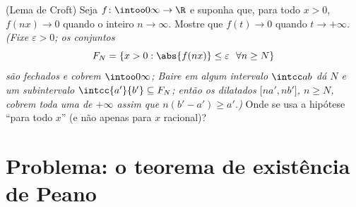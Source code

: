 \begin{exercise}[$\star\star\star$]\label{exo:b3:complete:12}
(Lema de Croft) Seja $f\colon\intoo0\infty\to\R$  e suponha que, para todo
$x > 0$, $f(nx) \to 0$ quando o inteiro $n \to \infty$. Mostre que $f(t) \to 0$ quando $t \to
+\infty$.
\emph{(Fixe $\varepsilon > 0$; os conjuntos
\[
F_N = \{x > 0 : \abs{f(nx)} \leq \varepsilon\ \ \forall n
\geq N\}
\]
são fechados e cobrem $\intoo0\infty$; Baire em algum intervalo $\intcc ab$ dá $N$ e
um subintervalo $\intcc{a'}{b'}
\subseteq F_N$; então os dilatados $\bigl[na', nb'\bigr]$, $n
\geq N$, cobrem toda uma
 de $+\infty$ assim que $n(b' - a') \geq a'$.)} Onde se usa a hipótese ``para
todo $x$'' (e não apenas para $x$ racional)?
\end{exercise}

\section{Problema: o teorema de existência de Peano}

